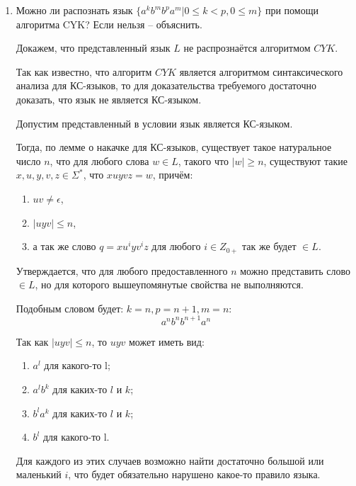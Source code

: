 \documentclass[12pt]{article}
\begin{document}
\bigskip
\begin{enumerate}
 \item Можно ли распознать язык $\{a^kb^mb^pa^m | 0 \leq k < p, 0 \leq m\}$ при помощи алгоритма CYK?
Если нельзя -- объяснить.

Докажем, что представленный язык $L$ не распрознаётся алгоритмом $CYK$.

Так как известно, что алгоритм $CYK$ является алгоритмом синтаксического анализа для КС-языков, то
для доказательства требуемого достаточно доказать, что язык не является КС-языком.

Допустим представленный в условии язык является КС-языком.

Тогда, по лемме о накачке для КС-языков, существует такое натуральное число $n$, что для любого слова $w \in L$,
такого что $|w| \geq n$, существуют такие $x, u, y, v, z \in \Sigma^*$, что $xuyvz = w$, причём: 
\begin{enumerate}
 \item $uv \neq \epsilon$,
 \item $|uyv| \leq n$,
 \item а так же слово $q = x u^i y v^i z$ для любого  $i \in Z_{0+}$ так же будет $\in L$.
\end{enumerate}

Утверждается, что для любого предоставленного $n$ можно представить слово $\in L$, но для которого вышеупомянутые свойства не выполняются.

Подобным словом будет: $k=n, p=n+1, m=n$:  
    \[
        a^n b^n b^{n+1} a^n
    \]

Так как $|uyv| \leq n$, то $ uyv $ может иметь вид:

    \begin{enumerate}
            \item $ a^l $ для какого-то l;
            \item $ a^l b^k $ для каких-то $l$ и $k$;
            \item $ b^l a^k $ для каких-то $l$ и $k$;
            \item $ b^l $ для какого-то l.
    \end{enumerate}

    Для каждого из этих случаев возможно найти достаточно большой или маленький $i$, что будет обязательно нарушено
какое-то правило языка.

\end{enumerate}
\end{document}
